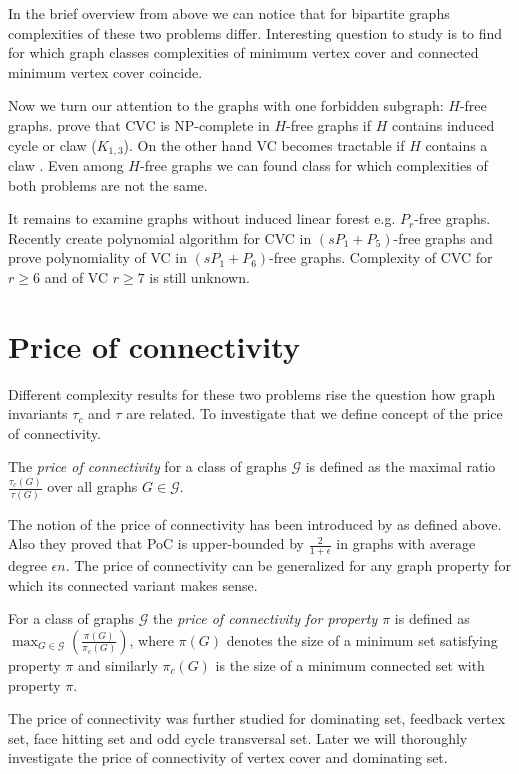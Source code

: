 In the brief overview from above we can notice that for bipartite graphs complexities of these two problems differ.
Interesting question to study is to find for which graph classes complexities of minimum vertex cover and connected minimum vertex cover
coincide.

Now we turn our attention to the graphs with one forbidden subgraph: \(H\)-free graphs.
\citet{Munaro17} prove that CVC is NP-complete in \(H\)-free graphs if \(H\) contains induced cycle or claw (\(K_{1,3}\)).
On the other hand VC becomes tractable if \(H\) contains a claw \cite{Sbihi80}\cite{Minty80}. 
Even among \(H\)-free graphs we can found class for which complexities of both problems are not the same. 

It remains to examine graphs without induced linear forest e.g. \(P_r\)-free graphs. 
Recently \citet{JohnsonPaesaniPaulusma20} create polynomial algorithm for CVC in \((sP_1 + P_5)\)-free graphs 
and \citet{Grzesik19} prove polynomiality of VC in \((sP_1 + P_6)\)-free graphs. 
Complexity of CVC for \(r \geq 6\) and of VC \(r \geq 7\) is still unknown.

\section{Price of connectivity} 
Different complexity results for these two problems rise the question how graph invariants \(\tau_c\) and \(\tau\) are related. 
To investigate that we define concept of the price of connectivity.
\begin{defn}
	The \emph{price of connectivity} for a class of graphs \(\mathcal{G}\) is defined as the maximal ratio \(\frac{\tau_c(G)}{\tau(G)}\) over all graphs \(G \in \mathcal{G}\).
\end{defn}

The notion of the price of connectivity has been introduced by \citet{CardinalLevy10} as defined above. 
Also they proved that PoC is upper-bounded by \(\frac{2}{1 + \epsilon}\) in graphs with average degree \(\epsilon n\).
The price of connectivity can be generalized for any graph property for which its connected variant makes sense.
\begin{defn}
	For a class of graphs \(\mathcal{G}\) the \emph{price of connectivity for property \(\pi\)} is defined as \(\max_{G \in \mathcal{G}}(\frac{\pi(G)}{\pi_c(G)})\), 
	where \(\pi(G)\) denotes the size of a minimum set satisfying property \(\pi\) and similarly \(\pi_c(G)\) is the size of a minimum connected set with property \(\pi\).
\end{defn}
The price of connectivity was further studied for dominating set, feedback vertex set, face hitting set and odd cycle transversal set.
Later we will thoroughly investigate the price of connectivity of vertex cover and dominating set.

